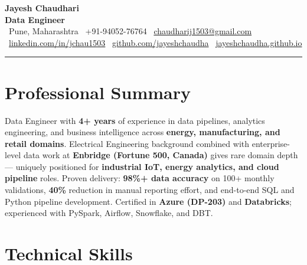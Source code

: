 \documentclass[10pt, a4paper]{article}
\begin{document}
\begin{center}
    {\Huge\bfseries\color{darkgray} Jayesh Chaudhari}\\[4pt]
    {\large\color{accent}\bfseries Data Engineer}\\[6pt]
    \textcolor{midgray}{\small
        \faMapMarker*\ Pune, Maharashtra \quad
        \faPhone\ +91-94052-76764 \quad
        \faEnvelope\ \href{mailto:chaudharij1503@gmail.com}{chaudharij1503@gmail.com}
    }\\[3pt]
    \textcolor{midgray}{\small
        \faLinkedin\ \href{https://linkedin.com/in/jchau1503}{linkedin.com/in/jchau1503} \quad
        \faGithub\ \href{https://github.com/jayeshchaudha}{github.com/jayeshchaudha} \quad
        \faGlobe\ \href{https://jayeshchaudha.github.io}{jayeshchaudha.github.io}
    }
\end{center}

\vspace{2pt}
\noindent\textcolor{rulecol}{\rule{\linewidth}{0.8pt}}
\vspace{2pt}

\section{Professional Summary}

\textcolor{midgray}{
Data Engineer with \textbf{4+ years} of experience in data pipelines, analytics engineering,
and business intelligence across \textbf{energy, manufacturing, and retail domains}.
Electrical Engineering background combined with enterprise-level data work at
\textbf{Enbridge (Fortune 500, Canada)} gives rare domain depth --- uniquely positioned
for \textbf{industrial IoT, energy analytics, and cloud pipeline} roles.
Proven delivery: \textbf{98\%+ data accuracy} on 100+ monthly validations, \textbf{40\%}
reduction in manual reporting effort, and end-to-end SQL and Python pipeline development.
Certified in \textbf{Azure (DP-203)} and \textbf{Databricks}; experienced with
PySpark, Airflow, Snowflake, and DBT.
}

\section{Technical Skills}
\end{document}
